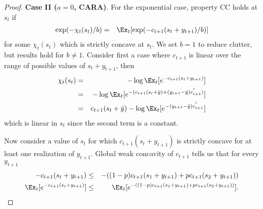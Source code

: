 \begin{proof}
	\bigskip
	\noindent \textbf{Case II ($a = 0$, CARA)}. For the exponential case, property CC holds at $s_{t}$ if
	\begin{eqnarray*}
	\exp(-\chi_{t}(s_{t})/b) & = & \Ex_{t}[ \exp(-c_{t+1}(s_{t}+{y}_{t+1})/b)]
	\end{eqnarray*}
	for some $\chi_{t}(s_{t})$ which is strictly concave at $s_{t}$. We set $b = 1$ to reduce clutter, but results hold for $b \neq 1$. Consider first a case where $c_{t+1}$ is linear over the range of possible values of $s_{t}+{y}_{t+1}$, then
	\begin{eqnarray}
	\chi_{t}(s_{t}) & = & -\log \Ex_{t}[e^{-c_{t+1}(s_{t}+{y}_{t+1})}] \nonumber
	\\& = & -\log \Ex_{t}[e^{-(c_{t+1}(s_{t}+\bar{y})+({y}_{t+1}-\bar{y})c_{t+1}^{'})}] \nonumber
	\\ & = & c_{t+1}(s_{t}+\bar{y}) - \log \Ex_{t}[e^{-({y}_{t+1}-\bar{y}) c_{t+1}^{'}}] \label{eq:expcdrops}
	\end{eqnarray}
	which is linear in $s_{t}$ since the second term is a constant.
	
	Now consider a value of $s_{t}$ for which $c_{t+1}(s_{t}+{y}_{t+1})$ is strictly concave for at least one realization of ${y}_{t+1}$. Global weak concavity of $c_{t+1}$ tells us that for every ${y}_{t+1}$
	\begin{eqnarray}
	-c_{t+1}(s_{t}+{y}_{t+1}) & \leq & -((1-p)c_{t+1}(s_1+{y}_{t+1})+pc_{t+1}(s_{2}+{y}_{t+1})) \nonumber
	\\ \Ex_{t}[e^{-c_{t+1}(s_{t}+{y}_{t+1})}] & \leq & \Ex_{t}[e^{-((1-p)c_{t+1}(s_1+{y}_{t+1})+pc_{t+1}(s_{2}+{y}_{t+1}))}]. \label{eq:expconc}
	\end{eqnarray}
	

\end{proof}
